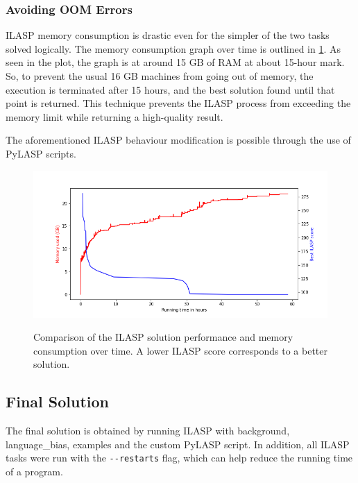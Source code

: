 \subsubsection{Avoiding OOM Errors}
\label{avoiding-oom-errors}

ILASP memory consumption is drastic even for the simpler of the two tasks solved logically.
The memory consumption graph over time is outlined in \ref{generalisation-memory-graph}.
As seen in the plot, the graph is at around 15 GB of RAM at about 15-hour mark.
So, to prevent the usual 16 GB machines from going out of memory, the execution is terminated after 15 hours, and the best solution found until that point is returned.
This technique prevents the ILASP process from exceeding the memory limit while returning a high-quality result.

The aforementioned ILASP behaviour modification is possible through the use of PyLASP scripts.

\begin{figure}[h]
\caption{Comparison of the ILASP solution performance and memory consumption over time. A lower ILASP score corresponds to a better solution.}
\centering
\includegraphics[width=\textwidth]{solving-nlp-tasks-logically/generalisation_memory_vs_best_score.png}
\label{generalisation-memory-graph}
\end{figure}

\subsection{Final Solution}

The final solution is obtained by running ILASP with background, language\_bias, examples and the custom PyLASP script.
In addition, all ILASP tasks were run with the \verb+--restarts+ flag, which can help reduce the running time of a program.

